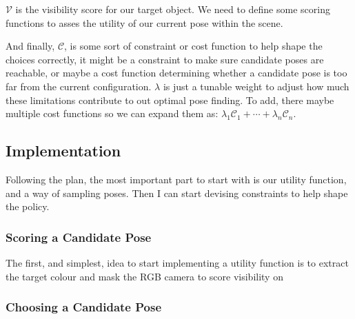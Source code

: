 $\mathcal{V}$ is the visibility score for our target object. We need to define some scoring functions to asses the utility of our current pose within the scene.

And finally, $\mathcal{C}$, is some sort of constraint or cost function to help shape the choices correctly, it might be a constraint to make sure candidate poses are reachable, or maybe a cost function determining whether a candidate pose is too far from the current configuration. $\lambda$ is just a tunable weight to adjust how much these limitations contribute to out optimal pose finding. To add, there maybe multiple cost functions so we can expand them as: \(\lambda_1\mathcal{C}_1 + \cdots +\lambda_n\mathcal{C}_n \).


\subsection{Implementation}
Following the plan, the most important part to start with is our utility function, and a way of sampling poses. Then I can start devising constraints to help shape the policy.

\subsubsection{Scoring a Candidate Pose}
The first, and simplest, idea to start implementing a utility function is to extract the target colour and mask the RGB camera to score visibility on 

\subsubsection{Choosing a Candidate Pose}


